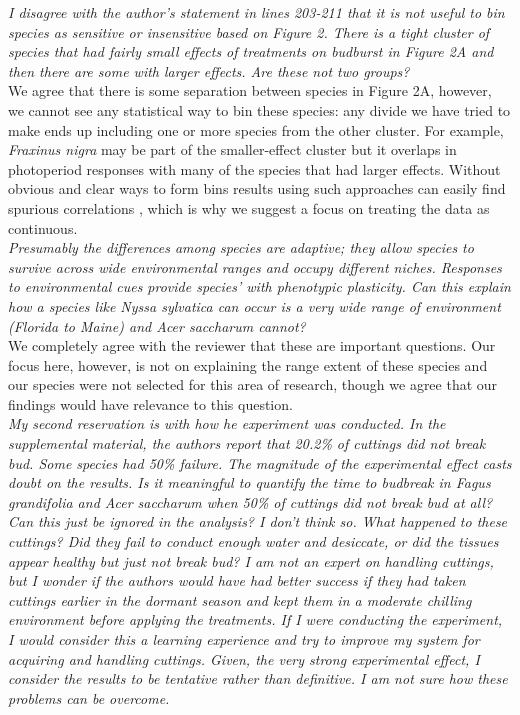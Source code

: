 \documentclass[11pt,a4paper]{article}
\begin{document}
\emph{I disagree with the author’s statement in lines 203-211 that it is not useful to bin species as sensitive or
insensitive based on Figure 2. There is a tight cluster of species that had fairly small
effects of treatments on budburst in Figure 2A and then there are some with larger effects.
Are these not two groups?} \\

We agree that there is some separation between species in Figure 2A, however, we cannot see any statistical way to bin these species: any divide we have tried to make ends up including one or more species from the other cluster. For example, \emph{Fraxinus nigra} may be part of the smaller-effect cluster but it overlaps in photoperiod responses with many of the species that had larger effects. Without obvious and clear ways to form bins results using such approaches can easily find spurious correlations \citep[e.g.,][]{gelmanbinning}, which is why we suggest a focus on treating the data as continuous. \\

\emph{Presumably the differences among species are adaptive; they allow
species to survive across wide environmental ranges and occupy different niches.  Responses
to environmental cues provide species’ with phenotypic plasticity.  Can this explain how a
species like Nyssa sylvatica can occur is a very wide range of environment (Florida to Maine)
and Acer saccharum cannot?}\\

We completely agree with the reviewer that these are important questions. Our focus here, however, is not on explaining the range extent of these species and our species were not selected for this area of research, though we agree that our findings would have relevance to this question. \\

\emph{My second reservation is with how he experiment was conducted. In the supplemental material,
the authors report that 20.2\% of cuttings did not break bud. Some species had 50\% failure.
The magnitude of the experimental effect casts doubt on the results.  Is it meaningful to
quantify the time to budbreak in Fagus grandifolia and Acer saccharum when 50\% of cuttings
did not break bud at all?  Can this just be ignored in the analysis?  I don’t think so. What
happened to these cuttings?  Did they fail to conduct enough water and desiccate, or did the
tissues appear healthy but just not break bud? I am not an expert on handling cuttings, but I
wonder if the authors would have had better success if they had taken cuttings earlier in the
dormant season and kept them in a moderate chilling environment before applying the
treatments. If I were conducting the experiment, I would consider this a learning experience
and try to improve my system for acquiring and handling cuttings.  Given, the very strong
experimental effect, I consider the results to be tentative rather than definitive. I am not
sure how these problems can be overcome.}\\
\end{document}
